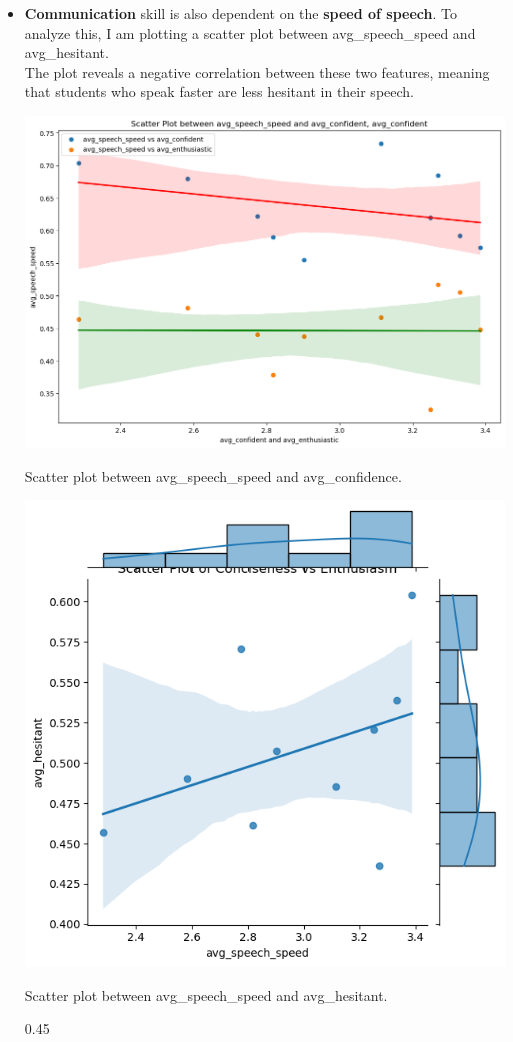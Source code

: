 \documentclass{article}
\begin{document}
\begin{itemize}
    \item \textbf{Communication} skill is also dependent on the \textbf{speed of speech}. To analyze this, I am plotting a scatter plot between avg\_speech\_speed and avg\_hesitant.\\
    
    The plot reveals a negative correlation between these two features, meaning that students who speak faster are less hesitant in their speech.
    \begin{center}
        \begin{minipage}{0.45\textwidth}
            \centering
            \includegraphics[width=\textwidth]{images/speech_confi.png}
            \caption{Scatter plot between avg\_speech\_speed and avg\_confidence.}
        \end{minipage}\hfill
        \begin{minipage}{0.45\textwidth}
            \centering
            \includegraphics[width=\textwidth]{images/avg_speech_speed_vs_avg_hesitant.png}
            \caption{Scatter plot between avg\_speech\_speed and avg\_hesitant.}
        \end{minipage}{0.45\textwidth}
         \end{center}


\end{itemize}
\end{document}
